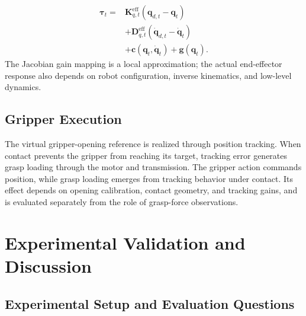 \begin{equation}
\begin{aligned}
    \boldsymbol{\tau}_t={}&
    \mathbf{K}_{q,t}^{\mathrm{eff}}
        (\mathbf{q}_{d,t}-\mathbf{q}_t)\\
    &+\mathbf{D}_{q,t}^{\mathrm{eff}}
        (\dot{\mathbf{q}}_{d,t}-\dot{\mathbf{q}}_t)\\
    &+\mathbf{c}(\mathbf{q}_t,\dot{\mathbf{q}}_t)
        +\mathbf{g}(\mathbf{q}_t).
    \label{eq:joint_impedance}
\end{aligned}
\end{equation}
The Jacobian gain mapping is a local approximation; the actual end-effector response also depends on robot configuration, inverse kinematics, and low-level dynamics.

\subsection{Gripper Execution}

The virtual gripper-opening reference is realized through position tracking.
When contact prevents the gripper from reaching its target, tracking error generates grasp loading through the motor and transmission.
The gripper action commands position, while grasp loading emerges from tracking behavior under contact.
Its effect depends on opening calibration, contact geometry, and tracking gains, and is evaluated separately from the role of grasp-force observations.

\section{Experimental Validation and Discussion}
\label{sec:experiments}

\subsection{Experimental Setup and Evaluation Questions}

